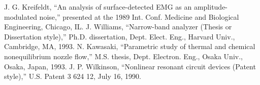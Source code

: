\documentclass[letterpaper, 10 pt, conference]{ieeeconf}  %
\begin{document}
\begin{thebibliography}{99}
 J. G. Kreifeldt, ``An analysis of surface-detected EMG as an amplitude-modulated noise,'' presented at the 1989 Int. Conf. Medicine and Biological Engineering, Chicago, IL.
 J. Williams, ``Narrow-band analyzer (Thesis or Dissertation style),'' Ph.D. dissertation, Dept. Elect. Eng., Harvard Univ., Cambridge, MA, 1993. 
 N. Kawasaki, ``Parametric study of thermal and chemical nonequilibrium nozzle flow,'' M.S. thesis, Dept. Electron. Eng., Osaka Univ., Osaka, Japan, 1993.
 J. P. Wilkinson, ``Nonlinear resonant circuit devices (Patent style),'' U.S. Patent 3 624 12, July 16, 1990. 






\end{thebibliography}
\end{document}
